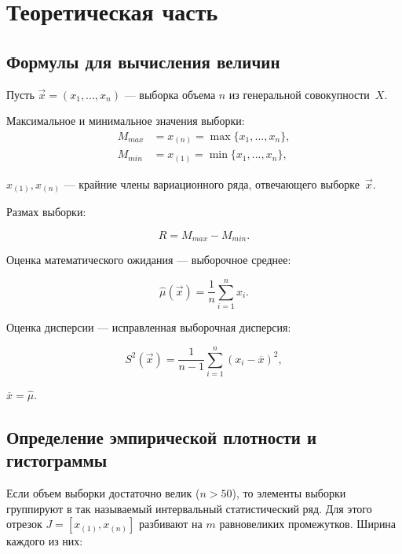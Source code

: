 \chapter{Теоретическая часть}

\section{Формулы для вычисления величин}

Пусть $\vec{x} = (x_1, ..., x_n)$ --- выборка объема $n$ из генеральной
совокупности~$X$.

Максимальное и минимальное значения выборки:
\begin{align}\label{eq:01}
    M_{max} &= x_{(n)} = \max\{x_1, ..., x_n\},\\
    M_{min} &= x_{(1)} = \min\{x_1, ..., x_n\},
\end{align}

 $x_{(1)}, x_{(n)}$ --- крайние члены вариационного ряда,
отвечающего выборке~$\vec{x}$.

Размах выборки:

\begin{equation}\label{eq:03}
    R = M_{max} - M_{min}.
\end{equation}

Оценка математического ожидания --- выборочное среднее:

\begin{equation}\label{eq:04}
    \hat{\mu}(\vec{x}) = \frac{1}{n}\sum_{i=1}^{n} x_i.
\end{equation}

Оценка дисперсии --- исправленная выборочная дисперсия:

\begin{equation}\label{eq:05}
    S^2(\vec x) = \frac 1{n-1} \sum_{i=1}^n (x_i-\overline x)^2,
\end{equation}

 $\overline x = \hat \mu$.

\section{Определение эмпирической плотности и гистограммы}

Если объем выборки достаточно велик ($n > 50$), то элементы выборки группируют в
так называемый интервальный статистический ряд. Для этого отрезок $J=[x_{(1)},
x_{(n)}]$ разбивают на $m$ равновеликих промежутков. Ширина каждого из них:

